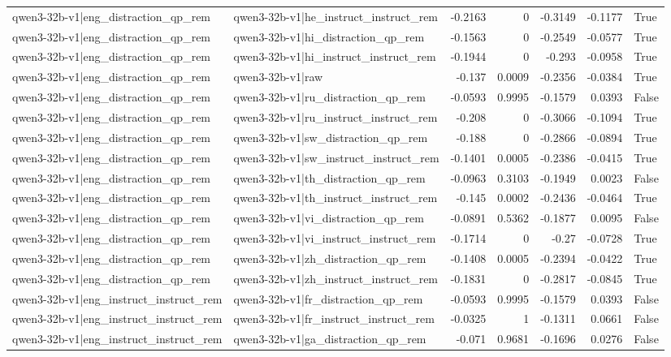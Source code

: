 \begin{table}
\begin{tabular}{l l r r r r l}
qwen3-32b-v1|eng_distraction_qp_rem & qwen3-32b-v1|he_instruct_instruct_rem & -0.2163 & 0 & -0.3149 & -0.1177 & True \\
qwen3-32b-v1|eng_distraction_qp_rem & qwen3-32b-v1|hi_distraction_qp_rem & -0.1563 & 0 & -0.2549 & -0.0577 & True \\
qwen3-32b-v1|eng_distraction_qp_rem & qwen3-32b-v1|hi_instruct_instruct_rem & -0.1944 & 0 & -0.293 & -0.0958 & True \\
qwen3-32b-v1|eng_distraction_qp_rem & qwen3-32b-v1|raw & -0.137 & 0.0009 & -0.2356 & -0.0384 & True \\
qwen3-32b-v1|eng_distraction_qp_rem & qwen3-32b-v1|ru_distraction_qp_rem & -0.0593 & 0.9995 & -0.1579 & 0.0393 & False \\
qwen3-32b-v1|eng_distraction_qp_rem & qwen3-32b-v1|ru_instruct_instruct_rem & -0.208 & 0 & -0.3066 & -0.1094 & True \\
qwen3-32b-v1|eng_distraction_qp_rem & qwen3-32b-v1|sw_distraction_qp_rem & -0.188 & 0 & -0.2866 & -0.0894 & True \\
qwen3-32b-v1|eng_distraction_qp_rem & qwen3-32b-v1|sw_instruct_instruct_rem & -0.1401 & 0.0005 & -0.2386 & -0.0415 & True \\
qwen3-32b-v1|eng_distraction_qp_rem & qwen3-32b-v1|th_distraction_qp_rem & -0.0963 & 0.3103 & -0.1949 & 0.0023 & False \\
qwen3-32b-v1|eng_distraction_qp_rem & qwen3-32b-v1|th_instruct_instruct_rem & -0.145 & 0.0002 & -0.2436 & -0.0464 & True \\
qwen3-32b-v1|eng_distraction_qp_rem & qwen3-32b-v1|vi_distraction_qp_rem & -0.0891 & 0.5362 & -0.1877 & 0.0095 & False \\
qwen3-32b-v1|eng_distraction_qp_rem & qwen3-32b-v1|vi_instruct_instruct_rem & -0.1714 & 0 & -0.27 & -0.0728 & True \\
qwen3-32b-v1|eng_distraction_qp_rem & qwen3-32b-v1|zh_distraction_qp_rem & -0.1408 & 0.0005 & -0.2394 & -0.0422 & True \\
qwen3-32b-v1|eng_distraction_qp_rem & qwen3-32b-v1|zh_instruct_instruct_rem & -0.1831 & 0 & -0.2817 & -0.0845 & True \\
qwen3-32b-v1|eng_instruct_instruct_rem & qwen3-32b-v1|fr_distraction_qp_rem & -0.0593 & 0.9995 & -0.1579 & 0.0393 & False \\
qwen3-32b-v1|eng_instruct_instruct_rem & qwen3-32b-v1|fr_instruct_instruct_rem & -0.0325 & 1 & -0.1311 & 0.0661 & False \\
qwen3-32b-v1|eng_instruct_instruct_rem & qwen3-32b-v1|ga_distraction_qp_rem & -0.071 & 0.9681 & -0.1696 & 0.0276 & False \\

\end{tabular}
\end{table}

